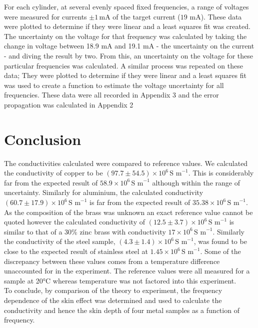 \documentclass[a4paper,12pt,twocolumn]{article}
\let\cite=\supercite
\begin{document}
	For each cylinder, at several evenly spaced fixed frequencies, a range of voltages were measured for currents $\pm 1 \,\text{mA}$ of the target current ($19$ mA). These data were plotted to determine if they were linear and a least squares fit was created. The uncertainty on the voltage for that frequency was calculated by taking the change in voltage between 18.9 mA and 19.1 mA - the uncertainty on the current - and diving the result by two. From this, an uncertainty on the voltage for these particular frequencies was calculated. A similar process was repeated on these data; They were plotted to determine if they were linear and a least squares fit was used to create a function to estimate the voltage uncertainty for all frequencies. These data were all recorded in Appendix 3 and the error propagation was calculated in Appendix 2\\
	

\section{Conclusion}
	The conductivities calculated were compared to reference values. We calculated the conductivity of copper to be $(97.7 \pm 54.5) \times 10^6 \,\text{S m}^{-1}$. This is considerably far from the expected result of $58.9 \times 10^6 \,\text{S m}^{-1}$\cite{conductivityCopper} although within the range of uncertainty. Similarly for aluminium, the calculated conductivity $(60.7 \pm 17.9) \times 10^6 \,\text{S m}^{-1}$ is far from the expected result of $35.38 \times 10^6 \,\text{S m}^{-1}$\cite{iowa}. As the composition of the brass was unknown an exact reference value cannot be quoted however the calculated conductivity of $(12.5 \pm 3.7) \times 10^6\,\text{S m}^{-1}$ is similar to that of a 30\% zinc brass with conductivity $17 \times 10^6 \,\text{S m}^{-1}$\cite{conductivityBrass}. Similarly the conductivity of the steel sample, $(4.3 \pm 1.4) \times 10^6 \,\text{S m}^{-1}$, was found to be close to the expected result of stainless steel at $1.45 \times 10^6 \,\text{S m}^{-1}$\cite{conductivity}. Some of the discrepancy between these values comes from a temperature difference unaccounted for in the experiment. The reference values were all measured for a sample at 20°C whereas temperature was not factored into this experiment. \\
	
	To conclude, by comparison of the theory to experiment, the frequency dependence of the skin effect was determined and used to calculate the conductivity and hence the skin depth of four metal samples as a function of frequency.\\
	
\end{document}
